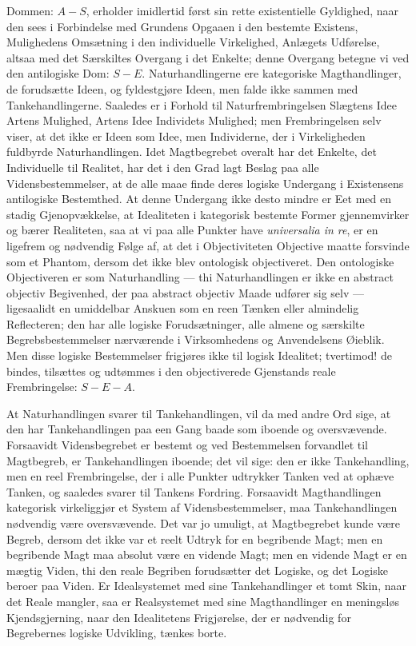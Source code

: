 \documentclass[11pt]{book}
\newcommand{\opage}[1]{\marginnote{\footnotesize\textit{[#1]}}}
\begin{document}
Dommen: $A - S$, erholder imidlertid først sin rette existentielle
Gyldighed, naar den sees i Forbindelse med Grundens Opgaaen i den
bestemte Existens, Mulighedens
\opage{222} \setcounter{footnote}{0}%
Omsætning i den individuelle Virkelighed, Anlægets Udførelse, altsaa med
det Særskiltes Overgang i det Enkelte; denne Overgang betegne vi ved den
antilogiske Dom: $S - E$. Naturhandlingerne ere kategoriske
Magthandlinger, de forudsætte Ideen, og fyldestgjøre Ideen, men falde
ikke sammen med Tankehandlingerne. Saaledes er i Forhold til
Naturfrembringelsen Slægtens Idee Artens Mulighed, Artens Idee Individets
Mulighed; men Frembringelsen selv viser, at det ikke er Ideen som Idee,
men Individerne, der i Virkeligheden fuldbyrde Naturhandlingen. Idet
Magtbegrebet overalt har det Enkelte, det Individuelle til Realitet, har
det i den Grad lagt Beslag paa alle Vidensbestemmelser, at de alle maae
finde deres logiske Undergang i Existensens antilogiske Bestemthed. At
denne Undergang ikke desto mindre er Eet med en stadig Gjenopvækkelse, at
Idealiteten i kategorisk bestemte Former gjennemvirker og bærer
Realiteten, saa at vi paa alle Punkter have \textit{universalia in re},
er en ligefrem og nødvendig Følge af, at det i Objectiviteten Objective
maatte forsvinde som et Phantom, dersom det ikke blev ontologisk
objectiveret. Den ontologiske Objectiveren er som Naturhandling --- thi
Naturhandlingen er ikke en abstract objectiv Begivenhed, der paa abstract
objectiv Maade udfører sig selv --- ligesaalidt en umiddelbar Anskuen som
en reen Tænken eller almindelig Reflecteren; den har alle logiske
Forudsætninger, alle almene og særskilte Begrebsbestemmelser nærværende i
Virksomhedens og Anvendelsens Øieblik. Men disse logiske Bestemmelser
frigjøres ikke til logisk Idealitet; tvertimod! de bindes, tilsættes og
udtømmes i den objectiverede Gjenstands reale Frembringelse: $S - E - A$.

At Naturhandlingen svarer til Tankehandlingen, vil da med andre Ord sige,
at den har Tankehandlingen paa een Gang baade som iboende og
oversvævende. Forsaavidt Vidensbegrebet er bestemt og ved Bestemmelsen
forvandlet til Magtbegreb, er Tankehandlingen iboende; det vil sige: den
er ikke
\opage{223} \setcounter{footnote}{0}%
Tankehandling, men en reel Frembringelse, der i alle Punkter udtrykker
Tanken ved at ophæve Tanken, og saaledes svarer til Tankens Fordring.
Forsaavidt Magthandlingen kategorisk virkeliggjør et System af
Vidensbestemmelser, maa Tankehandlingen nødvendig være oversvævende. Det
var jo umuligt, at Magtbegrebet kunde være Begreb, dersom det ikke var et
reelt Udtryk for en begribende Magt; men en begribende Magt maa absolut
være en vidende Magt; men en vidende Magt er en mægtig Viden, thi den
reale Begriben forudsætter det Logiske, og det Logiske beroer paa Viden.
Er Idealsystemet med sine Tankehandlinger et tomt Skin, naar det Reale
mangler, saa er Realsystemet med sine Magthandlinger en meningsløs
Kjendsgjerning, naar den Idealitetens Frigjørelse, der er nødvendig for
Begrebernes logiske Udvikling, tænkes borte.
\end{document}
